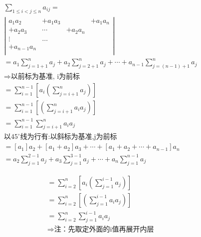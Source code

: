 \documentclass[fontset=windows]{article}
\begin{document}
    \begin{figure}[!htb]
    \begin{minipage}{0.5\linewidth}
        \begin{align}
        &\sum\limits_{1 \leq i<j \leq n} a_{i j}=\nonumber\\
        &\left|
        \begin{array}{cccc}
            a_{1}a_{2} & +a_{1} a_{3} & & +a_{1} a_{n} \\
            +a_{2} a_{3} & \cdots & +a_{2} a_{n} & \\
            \vdots & \ldots & & \\
            +a_{n-1} a_{n} & & &\\
        \end{array}
        \right|\nonumber\\
        &=a_{1}\sum_{j=1+1}^{n} a_{j}+a_{2} \sum_{j=2+1}^{n} a_{j}+\cdots+a_{n-1} \sum_{j=(n-1)+1}^{n} a_{j}\nonumber\\
        &\Longrightarrow\mbox{以前标为基准, i为前标} \nonumber\\
        &=\sum_{i=1}^{n-1}\left[a_{i}\left(\sum_{j=i+1}^{n} a_{j}\right)\right] \nonumber\\
        &=\sum_{i=1}^{n-1}\left[\left(\sum_{j=i+1}^{n} a_{i} a_{j}\right)\right]\nonumber\\
        &=\sum_{i=1}^{n-1} \sum_{j=i+1}^{n} a_{i} a_{j}\nonumber\\
        &\mbox{以}45^{\circ}\mbox{线为行有:以斜标为基准,j为前标}\nonumber\\
        & =\left[a_{1}\right] a_{2}+\left[a_{1}+a_{2}\right] a_{3}+\cdots+\left[a_{1}+a_{2}+\cdots+a_{n-1}\right] a_{n} 
        \nonumber\\
        & =a_{2} \sum_{j=1}^{2-1} a_{j}+a_{3} \sum_{j=1}^{3-1} a_{j}+\cdots+a_{n}\sum_{j=1}^{n-1} a_{j} \nonumber
    \end{align}
    \end{minipage}
    \vline
    \begin{minipage}{0.5\linewidth}
        \begin{align}
        &=\sum_{i=2}^{n}\left[a_{i}\left(\sum_{j=1}^{i-1} a_{j}\right)\right] \nonumber\\
        &=\sum_{i=2}^{n}\left[\left(\sum_{j=1}^{i-1} a_{i} a_{j}\right)\right] \nonumber\\
        & =\sum_{i=2}^{n} \sum_{j=1}^{i-1} a_{i} a_{j} \nonumber\\
        &\Longrightarrow  \mbox{注：先取定外面的i值再展开内层}\nonumber\\

\end{align}
\end{minipage}
\end{figure}
\end{document}
